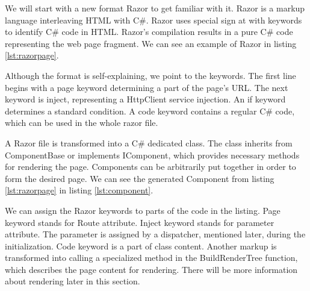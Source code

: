 \par
We will start with a new format Razor to get familiar with it.
Razor is a markup language interleaving HTML with C\#.
Razor uses special sign at with keywords to identify C\# code in HTML.
Razor's compilation results in a pure C\# code representing the web page fragment.
We can see an example of Razor in listing \ref{lst:razorpage}.
\par
Although the format is self-explaining, we point to the keywords.
The first line begins with a page keyword determining a part of the page's URL.
The next keyword is inject, representing a HttpClient service injection. 
An if keyword determines a standard condition.
A code keyword contains a regular C\# code, which can be used in the whole razor file.
\par
A Razor file is transformed into a C\# dedicated class.
The class inherits from ComponentBase or implements IComponent, which provides necessary methods for rendering the page.
Components can be arbitrarily put together in order to form the desired page.
We can see the generated Component from listing \ref{lst:razorpage} in listing \ref{lst:component}.
\par
We can assign the Razor keywords to parts of the code in the listing.
Page keyword stands for Route attribute.
Inject keyword stands for parameter attribute. The parameter is assigned by a dispatcher, mentioned later, during the initialization.
Code keyword is a part of class content.
Another markup is transformed into calling a specialized method in the BuildRenderTree function, which describes the page content for rendering. 
There will be more information about rendering later in this section.
\par
